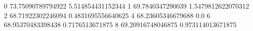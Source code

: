 0 73.75090789794922 5.514854431152344
1 69.7840347290039 1.5479812622070312
2 68.71922302246094 0.4831695556640625
4 68.23605346679688 0.0
6 68.95370483398438 0.7176513671875
8 69.20916748046875 0.973114013671875
